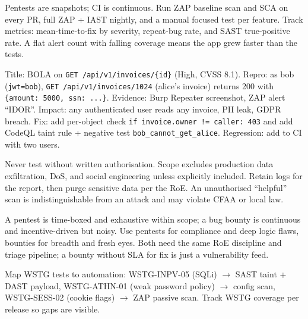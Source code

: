 \begin{remark}
Pentests are snapshots; CI is continuous. Run ZAP baseline scan and SCA on every PR, full ZAP + IAST nightly, and a manual focused test per feature. Track metrics: mean-time-to-fix by severity, repeat-bug rate, and SAST true-positive rate. A flat alert count with falling coverage means the app grew faster than the tests.
\end{remark}

\begin{example}
Title: BOLA on \texttt{GET /api/v1/invoices/\{id\}} (High, CVSS 8.1). Repro: as bob (\texttt{jwt=bob}), \texttt{GET /api/v1/invoices/1024} (alice's invoice) returns 200 with \texttt{\{amount: 5000, ssn: ...\}}. Evidence: Burp Repeater screenshot, ZAP alert ``IDOR''. Impact: any authenticated user reads any invoice, PII leak, GDPR breach. Fix: add per-object check \texttt{if invoice.owner != caller: 403} and add CodeQL taint rule + negative test \texttt{bob\_cannot\_get\_alice}. Regression: add to CI with two users.
\end{example}

\begin{remark}
Never test without written authorisation. Scope excludes production data exfiltration, DoS, and social engineering unless explicitly included. Retain logs for the report, then purge sensitive data per the RoE. An unauthorised ``helpful'' scan is indistinguishable from an attack and may violate CFAA or local law.
\end{remark}

\begin{remark}
A pentest is time-boxed and exhaustive within scope; a bug bounty is continuous and incentive-driven but noisy. Use pentests for compliance and deep logic flaws, bounties for breadth and fresh eyes. Both need the same RoE discipline and triage pipeline; a bounty without SLA for fix is just a vulnerability feed.
\end{remark}

\begin{example}
Map WSTG tests to automation: WSTG-INPV-05 (SQLi) $\to$ SAST taint + DAST payload, WSTG-ATHN-01 (weak password policy) $\to$ config scan, WSTG-SESS-02 (cookie flags) $\to$ ZAP passive scan. Track WSTG coverage per release so gaps are visible.
\end{example}

